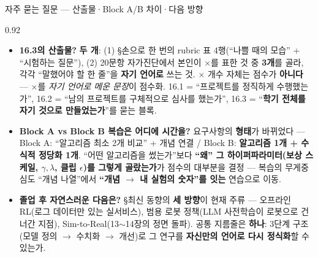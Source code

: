 \begin{frame}{자주 묻는 질문 — 산출물·Block A/B 차이·다음 방향}
\begin{center}\begin{varwidth}{0.92\textwidth}
  \small
  \begin{itemize}
    \item \textbf{16.3의 산출물?} \textbf{두 개}: (1) §손으로
      한 번의 rubric 표 4행(``나쁠 때의 모습'' + ``시험하는
      질문''), (2) 20문항 자가진단에서 본인이 $\times$를 표한 것
      중 \textbf{3개}를 골라, 각각 ``말했어야 할 한 줄''을
      \textbf{자기 언어로} 쓰는 것. $\times$ 개수 자체는 점수가
      \textbf{아니다} — $\times$를 \emph{자기 언어로 메운 문장}이
      점수화. 16.1 = ``프로젝트를 정직하게 수행했는가'', 16.2 =
      ``남의 프로젝트를 구체적으로 심사를 했는가'', 16.3 = ``\textbf{학기
      전체를 자기 것으로 만들었는가}''를 묻는 블록.
    \item \textbf{Block A vs Block B 복습은 어디에 시간을?}
      요구사항의 \textbf{형태}가 바뀌었다 — Block A: ``알고리즘
      최소 2개 비교'' + 개념 연결 / Block B: \textbf{알고리즘 1개
      + 수식적 정당화 1개}. ``어떤 알고리즘을 썼는가''보다
      \textbf{``왜'' 그 하이퍼파라미터(보상 스케일, $\gamma,
      \lambda$, 클립 $\epsilon$)를 그렇게 골랐는가}가 점수의 대부분을
      결정 — 복습의 무게중심도 ``개념 나열''에서 \textbf{``개념
      $\to$ 내 실험의 숫자''를 잇는} 연습으로 이동.
    \item \textbf{졸업 후 자연스러운 다음은?} §최신 동향의
      \textbf{세 방향}이 현재 주류 — 오프라인 RL(로그 데이터만
      있는 실서비스), 범용 로봇 정책(LLM 사전학습이 로봇으로
      건너간 지점), Sim-to-Real(13$\sim$14장의 정면 돌파).
      공통 지름줄은 \textbf{하나}: 3단계 구조(모델 정의 $\to$
      수치화 $\to$ 개선)로 그 연구를 \textbf{자신만의 언어로
      다시 정식화}할 수 있는가.
  \end{itemize}
\end{varwidth}\end{center}
\end{frame}
